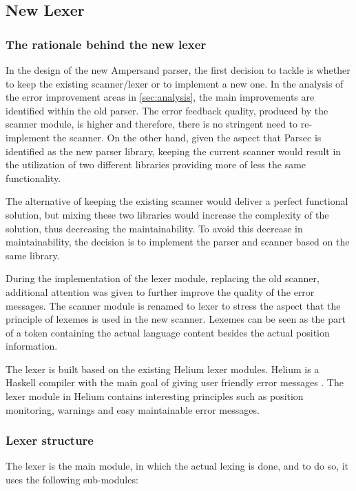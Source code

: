 
\subsection{New Lexer}
\label{design:new-lexer}

\subsubsection{The rationale behind the new lexer}
In the design of the new Ampersand parser, the first decision to tackle is whether to keep the existing scanner/lexer or to implement a new one.
In the analysis of the error improvement areas in \autoref{sec:analysis}, the main improvements are identified within the old parser.
The error feedback quality, produced by the scanner module, is higher and therefore, there is no stringent need to re-implement the scanner.
On the other hand, given the aspect that Parsec is identified as the new parser library, keeping the current scanner would result in the utilization of two different libraries providing more of less the same functionality.

The alternative of keeping the existing scanner would deliver a perfect functional solution, but mixing these two libraries would increase the complexity of the solution, thus decreasing the maintainability.
To avoid this decrease in maintainability, the decision is to implement the parser and scanner based on the same library.

During the implementation of the lexer module, replacing the old scanner, additional attention was given to further improve the quality of the error messages.
The scanner module is renamed to lexer to stress the aspect that the principle of lexemes is used in the new scanner.
Lexemes can be seen as the part of a token containing the actual language content besides the actual position information.

The lexer is built based on the existing Helium lexer modules. 
Helium is a Haskell compiler with the main goal of giving user friendly error messages .
The lexer module in Helium contains interesting principles such as position monitoring, warnings and easy maintainable error messages.


\subsubsection{Lexer structure}
The lexer is the main module, in which the actual lexing is done, and to do so, it uses the following sub-modules:

